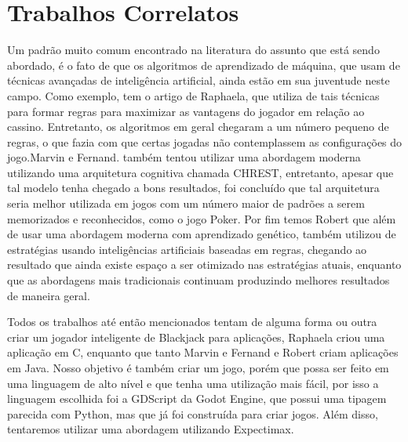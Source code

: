\section{Trabalhos Correlatos}


    Um padrão muito comum encontrado na literatura do assunto que está sendo abordado, 
    é o fato de que os algoritmos de aprendizado de máquina, que usam de técnicas avançadas 
    de inteligência artificial, ainda estão em sua juventude neste campo. Como exemplo, tem o 
    artigo de Raphaela\cite{DefinicaoEstrategias}, que utiliza de tais técnicas para formar regras para maximizar 
    as vantagens do jogador em relação ao cassino. Entretanto, os algoritmos em geral chegaram
    a um número pequeno de regras, o que fazia com que certas jogadas não contemplassem as configurações 
    do jogo.Marvin e Fernand\cite{CognitiveAIModels}. também tentou utilizar uma abordagem moderna utilizando uma 
    arquitetura cognitiva chamada CHREST, entretanto, apesar que tal modelo tenha chegado a bons 
    resultados, foi concluído que tal arquitetura seria melhor utilizada em jogos com um número 
    maior de padrões a serem memorizados e reconhecidos, como o jogo Poker. Por fim temos Robert\cite{EmTurnos}
    que além de usar uma abordagem moderna com aprendizado genético, também utilizou de estratégias usando 
    inteligências artificiais baseadas em regras, chegando ao resultado que ainda existe espaço a 
    ser otimizado nas estratégias atuais, enquanto que as abordagens mais tradicionais
    continuam produzindo melhores resultados de maneira geral.

    Todos os trabalhos até então mencionados tentam de alguma forma ou outra 
    criar um jogador inteligente de Blackjack para aplicações, Raphaela\cite{DefinicaoEstrategias} criou 
    uma aplicação em C, enquanto que tanto Marvin e Fernand\cite{CognitiveAIModels} e Robert\cite{EmTurnos} criam 
    aplicações em Java. Nosso objetivo é também criar um jogo, porém que possa ser feito 
    em uma linguagem de alto nível e que tenha uma utilização mais fácil, por isso a linguagem 
    escolhida foi a GDScript da Godot Engine, que possui uma tipagem parecida com 
    Python, mas que já foi construída para criar jogos. Além disso, tentaremos utilizar uma abordagem 
    utilizando Expectimax.
